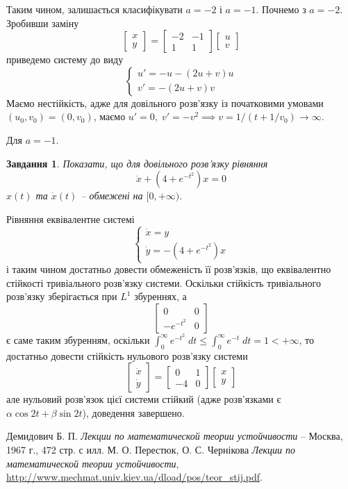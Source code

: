 \documentclass[12pt]{article} %
\newtheorem{prob}{Завдання}
\begin{document}
	Таким чином, залишається класифікувати $a=-2$ і $a=-1$. Почнемо з $a=-2$. Зробивши заміну
	\[\begin{bmatrix}x\\y\end{bmatrix}=\begin{bmatrix}-2&-1\\1&1\end{bmatrix}\begin{bmatrix}u\\v\end{bmatrix}\]
	приведемо систему до виду
	\[\begin{cases}u'=-u-(2u+v)u\\v'=-(2u+v)v\end{cases}\]
	Маємо нестійкість, адже для довільного розв’язку із початковими умовами $(u_0,v_0)=(0,v_0)$, маємо $u'=0,\;v'=-v^2\implies
	v=1/(t+1/v_0)\to\infty$.

	Для $a=-1$.
\begin{prob}Показати, що для довільного розв’язку рівняння
	\[\ddot{x}+(4+e^{-t^2})x=0\]
	$x(t)$ та $\dot{x}(t)$ -- обмежені на $[0,+\infty)$.\end{prob}
	Рівняння еквівалентне системі
	\[\begin{cases}\dot{x}=y\\\dot{y}=-(4+e^{-t^2})x\end{cases}\]
	і таким чином достатньо довести обмеженість її розв’язків, що еквівалентно стійкості тривіального розв’язку системи. Оскільки стійкість
	тривіального розв’язку зберігається при $L^1$ збуреннях, а \[\begin{bmatrix}0&0\\-e^{-t^2}&0\end{bmatrix}\]
	є саме таким збуренням, оскільки $\int_0^\infty e^{-t^2}\;dt\leq\int_0^\infty e^{-t}\;dt=1<+\infty$, то достатньо довести стійкість 
	нульового розв’язку системи
	\[\begin{bmatrix}\dot{x}\\\dot{y}\end{bmatrix}=\begin{bmatrix}0&1\\-4&0\end{bmatrix}\begin{bmatrix}x\\y\end{bmatrix}\]
	але нульовий розв’язок цієї системи стійкий (адже розв’язками є $\alpha\cos 2t+\beta\sin 2t$), доведення завершено.
\begin{thebibliography}{9}
Демидович Б. П. \emph{Лекции по математической теории устойчивости} --
Москва, 1967 г., 472 стр. с илл.
М. О. Перестюк, О. С. Чернікова \emph{Лекции по математической теории устойчивости}, \url{
http://www.mechmat.univ.kiev.ua/dload/pos/teor_stij.pdf}.
\end{thebibliography}
\end{document}
